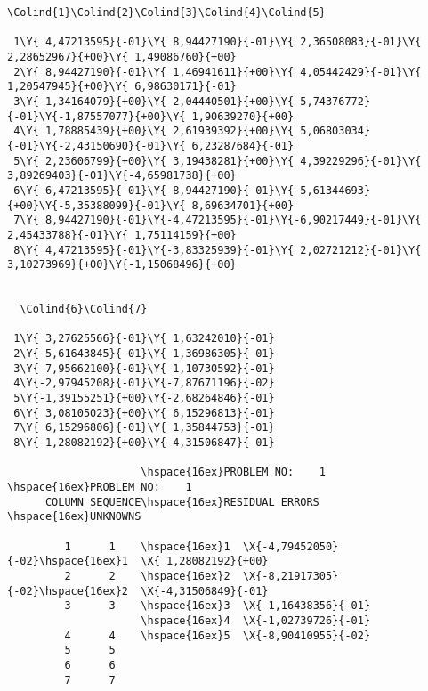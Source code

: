 \begin{landscape}
\begin{Verbatim}[commandchars=\\\{\},codes={\catcode`$=3\catcode`_=8}]
  \Colind{1}\Colind{2}\Colind{3}\Colind{4}\Colind{5}

 1\Y{ 4,47213595}{-01}\Y{ 8,94427190}{-01}\Y{ 2,36508083}{-01}\Y{ 2,28652967}{+00}\Y{ 1,49086760}{+00}
 2\Y{ 8,94427190}{-01}\Y{ 1,46941611}{+00}\Y{ 4,05442429}{-01}\Y{ 1,20547945}{+00}\Y{ 6,98630171}{-01}
 3\Y{ 1,34164079}{+00}\Y{ 2,04440501}{+00}\Y{ 5,74376772}{-01}\Y{-1,87557077}{+00}\Y{ 1,90639270}{+00}
 4\Y{ 1,78885439}{+00}\Y{ 2,61939392}{+00}\Y{ 5,06803034}{-01}\Y{-2,43150690}{-01}\Y{ 6,23287684}{-01}
 5\Y{ 2,23606799}{+00}\Y{ 3,19438281}{+00}\Y{ 4,39229296}{-01}\Y{ 3,89269403}{-01}\Y{-4,65981738}{+00}
 6\Y{ 6,47213595}{-01}\Y{ 8,94427190}{-01}\Y{-5,61344693}{+00}\Y{-5,35388099}{-01}\Y{ 8,69634701}{+00}
 7\Y{ 8,94427190}{-01}\Y{-4,47213595}{-01}\Y{-6,90217449}{-01}\Y{ 2,45433788}{-01}\Y{ 1,75114159}{+00}
 8\Y{ 4,47213595}{-01}\Y{-3,83325939}{-01}\Y{ 2,02721212}{-01}\Y{ 3,10273969}{+00}\Y{-1,15068496}{+00}


  \Colind{6}\Colind{7}

 1\Y{ 3,27625566}{-01}\Y{ 1,63242010}{-01}
 2\Y{ 5,61643845}{-01}\Y{ 1,36986305}{-01}
 3\Y{ 7,95662100}{-01}\Y{ 1,10730592}{-01}
 4\Y{-2,97945208}{-01}\Y{-7,87671196}{-02}
 5\Y{-1,39155251}{+00}\Y{-2,68264846}{-01}
 6\Y{ 3,08105023}{+00}\Y{ 6,15296813}{-01}
 7\Y{ 6,15296806}{-01}\Y{ 1,35844753}{-01}
 8\Y{ 1,28082192}{+00}\Y{-4,31506847}{-01}

                     \hspace{16ex}PROBLEM NO:    1  \hspace{16ex}PROBLEM NO:    1
      COLUMN SEQUENCE\hspace{16ex}RESIDUAL ERRORS   \hspace{16ex}UNKNOWNS

         1      1    \hspace{16ex}1  \X{-4,79452050}{-02}\hspace{16ex}1  \X{ 1,28082192}{+00}
         2      2    \hspace{16ex}2  \X{-8,21917305}{-02}\hspace{16ex}2  \X{-4,31506849}{-01}
         3      3    \hspace{16ex}3  \X{-1,16438356}{-01}
                     \hspace{16ex}4  \X{-1,02739726}{-01}
         4      4    \hspace{16ex}5  \X{-8,90410955}{-02}
         5      5
         6      6
         7      7
\end{Verbatim}
\end{landscape}
